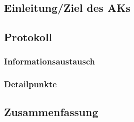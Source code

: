 \subsection{Einleitung/Ziel des AKs}

\subsection{Protokoll}

\subsubsection{Informationsaustausch}

\subsubsection{Detailpunkte}

\subsection{Zusammenfassung}